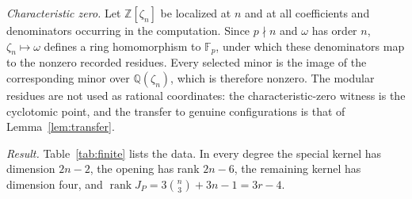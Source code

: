 \documentclass{amsart}
\theoremstyle{definition}
\theoremstyle{remark}
\numberwithin{equation}{section}
\newcommand{\ZZ}{\mathbb{Z}}
\newcommand{\QQ}{\mathbb{Q}}
\DeclareMathOperator{\rank}{rank}
\begin{document}
\emph{Characteristic zero.} Let $\ZZ[\zeta_n]$ be localized at $n$ and at all coefficients and
denominators occurring in the computation. Since $p\nmid n$ and $\omega$ has order $n$,
$\zeta_n\mapsto\omega$ defines a ring homomorphism to $\mathbb F_p$, under which these
denominators map to the nonzero recorded residues. Every selected minor is the image of the
corresponding minor over $\QQ(\zeta_n)$, which is therefore nonzero. The modular residues are
not used as rational coordinates: the characteristic-zero witness is the cyclotomic point,
and the transfer to genuine configurations is that of Lemma~\ref{lem:transfer}.

\emph{Result.} Table~\ref{tab:finite} lists the data. In every degree the special kernel has
dimension $2n-2$, the opening has rank $2n-6$, the remaining kernel has dimension four, and
$\rank J_P=3\binom n3+3n-1=3r-4$.
\end{document}
